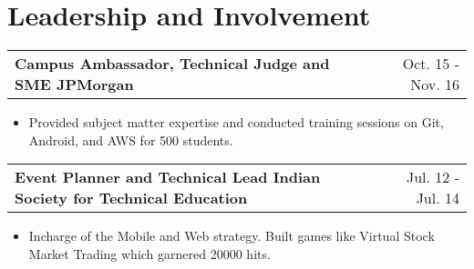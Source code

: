 \documentclass[a4paper,10pt]{article}
\makeatletter
\newcommand{\projectHeading}[2]{
    \begin{tabular*}{1\textwidth}{l@{\extracolsep{\fill}}r}
      \large{\textbf{#1}} & \small{#2} 
    \end{tabular*}
}
\newcommand{\resumeItemListStart}{\begin{itemize}[topsep=2.2pt, parsep=1pt, listparindent=0pt, itemindent=0pt, itemsep=1pt, leftmargin=*]}
\newcommand{\resumeItemListEnd}{\end{itemize}}
\makeatother
\begin{document}

\section{Leadership and Involvement}
    
    \projectHeading{Campus Ambassador, Technical Judge and SME \textbar{} JPMorgan}{Oct. 15 - Nov. 16}
    \resumeItemListStart
    	\item\small{Provided subject matter expertise and conducted training sessions on Git, Android, and AWS for 500 students.}
    \resumeItemListEnd
    
    \projectHeading{Event Planner and Technical Lead \textbar{} Indian Society for Technical Education }{Jul. 12 - Jul. 14}
    \resumeItemListStart
    	\item\small{Incharge of the Mobile and Web strategy. Built games like Virtual Stock Market Trading which garnered 20000 hits.}
    \resumeItemListEnd
    

\end{document}
